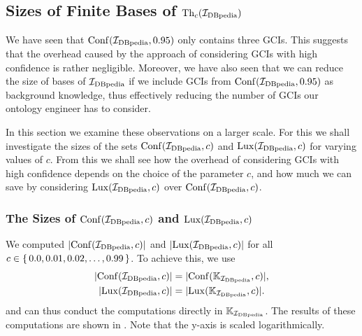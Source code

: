 \subsection{Sizes of Finite Bases of $\operatorname{Th}_c({\mathcal{I}_{\text{DBpedia}}})$}
\label{sec:sizes-finite-bases}

We have seen that $\operatorname{Conf}({\mathcal{I}_{\text{DBpedia}}}, 0.95)$ only contains three GCIs.  This suggests that
the overhead caused by the approach of considering GCIs with high confidence is rather
negligible.  Moreover, we have also seen that we can reduce the size of bases of
${\mathcal{I}_{\text{DBpedia}}}$ if we include GCIs from $\operatorname{Conf}({\mathcal{I}_{\text{DBpedia}}}, 0.95)$ as background knowledge, thus
effectively reducing the number of GCIs our ontology engineer has to consider.

In this section we examine these observations on a larger scale.  For this we shall
investigate the sizes of the sets $\operatorname{Conf}({\mathcal{I}_{\text{DBpedia}}}, c)$ and $\operatorname{Lux}({\mathcal{I}_{\text{DBpedia}}}, c)$ for
varying values of $c$.  From this we shall see how the overhead of considering GCIs with
high confidence depends on the choice of the parameter $c$, and how much we can save by
considering $\operatorname{Lux}({\mathcal{I}_{\text{DBpedia}}}, c)$ over $\operatorname{Conf}({\mathcal{I}_{\text{DBpedia}}}, c)$.

\subsubsection{The Sizes of $\operatorname{Conf}({\mathcal{I}_{\text{DBpedia}}},c)$ and $\operatorname{Lux}({\mathcal{I}_{\text{DBpedia}}}, c)$}
\label{sec:size-confidbpedia-c}

We computed $\lvert \operatorname{Conf}({\mathcal{I}_{\text{DBpedia}}}, c) \rvert$ and $\lvert \operatorname{Lux}({\mathcal{I}_{\text{DBpedia}}}, c) \rvert$ for all $c \in
{\ensuremath{\{\, 0.0, 0.01, 0.02, \dots, 0.99 \,\}}}$.  To achieve this, we use
\begin{align*}
  \lvert \operatorname{Conf}({\mathcal{I}_{\text{DBpedia}}}, c) \rvert &= \lvert \operatorname{Conf}({\mathbb{K}}_{\mathcal{I}_{\text{DBpedia}}}, c) \rvert, \\
  \lvert \operatorname{Lux}({\mathcal{I}_{\text{DBpedia}}}, c) \rvert &= \lvert \operatorname{Lux}({\mathbb{K}}_{\mathcal{I}_{\text{DBpedia}}}, c) \rvert.
\end{align*}
and can thus conduct the computations directly in ${\mathbb{K}}_{\mathcal{I}_{\text{DBpedia}}}$.  The results of
these computations are shown in .  Note that the y-axis is
scaled logarithmically.

